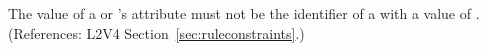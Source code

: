 The value of a \RateRule or \AssignmentRule's  attribute must not be the identifier of a \Compartment with a  value of .
(References: L2V4 Section~\ref{sec:ruleconstraints}.)
